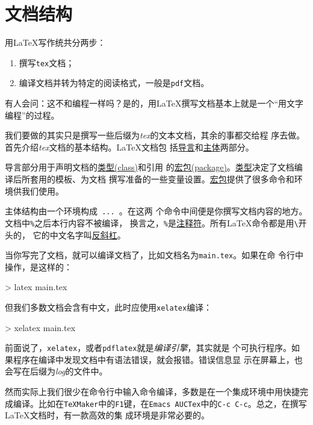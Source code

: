 \section{文档结构}

用\LaTeX{}写作统共分两步：
\begin{enumerate}
\item 撰写\texttt{tex}文档；
\item 编译文档并转为特定的阅读格式，一般是\texttt{pdf}文档。
\end{enumerate}

有人会问：这不和编程一样吗？是的，用\LaTeX{}撰写文档基本上就是一个“用文字
编程”的过程。

我们要做的其实只是撰写一些后缀为\textit{tex}的文本文档，其余的事都交给程
序去做。首先介绍\textit{tex}文档的基本结构。\LaTeX{}文档包
括\uline{导言}和\uline{主体}两部分。

导言部分用于声明文档的\uline{类型(class)}和引用
的\uline{宏包(package)}。\uline{类型}决定了文档编译后所套用的模板、为文档
撰写准备的一些变量设置。\uline{宏包}提供了很多命令和环境供我们使用。

主体结构由一个环境构成\verb! ... !。在这两
个命令中间便是你撰写文档内容的地方。文档中\verb!%!之后本行内容不被编译，
换言之，\verb!%!是\uline{注释符}。所有\LaTeX{}命令都是用\verb!\!开头的，
它的中文名字叫\uline{反斜杠}。

  

当你写完了文档，就可以编译文档了，比如文档名为\texttt{main.tex}。如果在命
令行中操作，是这样的：

\begin{cmd}
  > latex main.tex
\end{cmd}

但我们多数文档会含有中文，此时应使用\texttt{xelatex}编译：

\begin{cmd}
  > xelatex main.tex
\end{cmd}

前面说了，\texttt{xelatex}，或者\texttt{pdflatex}就是\emph{编译引擎}，其实就是
个可执行程序。如果程序在编译中发现文档中有语法错误，就会报错。错误信息显
示在屏幕上，也会写在后缀为\textit{log}的文件中。

然而实际上我们很少在命令行中输入命令编译，多数是在一个集成环境中用快捷完
成编译。比如在\texttt{TeXMaker}中的\texttt{F1}键，在\texttt{Emacs
AUCTex}中的\texttt{C-c C-c}。总之，在撰写\LaTeX{}文档时，有一款高效的集
成环境是非常必要的。

